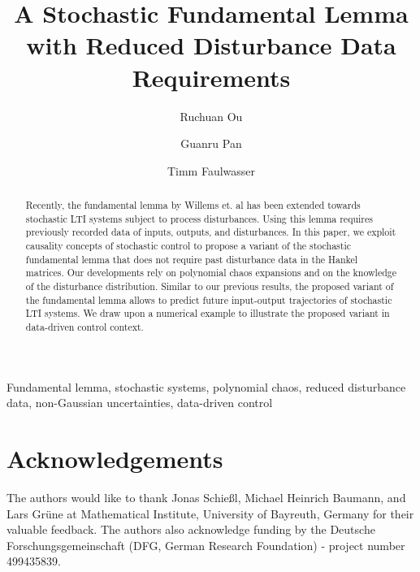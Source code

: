 \documentclass[final,5p,times,twocolumn]{elsarticle}
\begin{document}
\begin{frontmatter}
\title{A Stochastic Fundamental Lemma with Reduced Disturbance Data Requirements}

\author{Ruchuan Ou}
\author{Guanru Pan}  

\author{Timm Faulwasser}

\address{Institute of Control Systems, Hamburg University of Technology, 21079 Hamburg, Germany}                                        

\begin{keyword}                            
Fundamental lemma, stochastic systems, polynomial chaos, reduced disturbance data, non-Gaussian uncertainties, data-driven control
\end{keyword}                           


\begin{abstract}
Recently, the fundamental lemma by Willems et. al has been extended towards stochastic LTI systems subject to process disturbances. Using this lemma requires previously recorded data of inputs, outputs, and disturbances. In this paper, we exploit causality concepts of stochastic control to propose a variant of the stochastic fundamental lemma that does not require past disturbance data in the Hankel matrices. Our developments rely on polynomial chaos expansions and on the knowledge of the disturbance distribution. Similar to our previous results, the proposed variant of the fundamental lemma allows to predict future input-output trajectories of stochastic LTI systems. We draw upon a numerical example to illustrate the proposed variant in data-driven control context.
\end{abstract}
\end{frontmatter}







\section*{Acknowledgements}
The authors would like to thank Jonas Schie{\ss}l, Michael Heinrich Baumann, and Lars Gr{\"u}ne at Mathematical Institute, University of Bayreuth, Germany for their valuable feedback. The authors also acknowledge funding by the Deutsche Forschungsgemeinschaft (DFG, German Research Foundation) - project number 499435839.
                         

\end{document}
